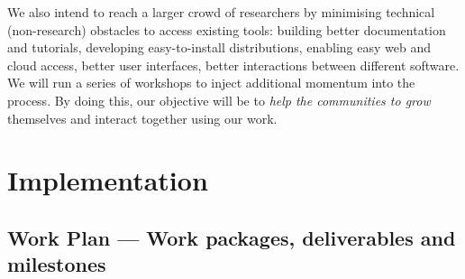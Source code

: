 \documentclass[noworkareas,deliverables,\classoptions]{euproposal}       %
\begin{document}
\begin{proposal}
We also intend to reach a larger crowd of researchers by minimising
technical (non-research) obstacles to access existing tools: building
better documentation and tutorials, developing easy-to-install
distributions, enabling easy web and cloud access, better user
interfaces, better interactions between different software.  We will
run a series of workshops to inject additional momentum into the
process. By doing this, our objective will be to \emph{help the
  communities to grow} themselves and interact together using our
work.


\clearpage

\draftpage


\draftpage


\draftpage


\draftpage


\clearpage


\section{Implementation}


\subsection{Work Plan --- Work packages, deliverables and milestones}
\label{sect:workplan}


\end{proposal}
\end{document}
